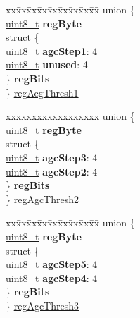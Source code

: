 \begin{DoxyCompactItemize}
\begin{tabbing}
\end{tabbing}\item 
\begin{tabbing}
xx\=xx\=xx\=xx\=xx\=xx\=xx\=xx\=xx\=\kill
union \{\\
\>\hyperlink{vl53l0x__types_8h_aba7bc1797add20fe3efdf37ced1182c5}{uint8\_t} {\bfseries regByte}\\
\>struct \{\\
\>\>\hyperlink{vl53l0x__types_8h_aba7bc1797add20fe3efdf37ced1182c5}{uint8\_t} {\bfseries agcStep1}: 4\\
\>\>\hyperlink{vl53l0x__types_8h_aba7bc1797add20fe3efdf37ced1182c5}{uint8\_t} {\bfseries unused}: 4\\
\>\} {\bfseries regBits}\\
\} \hyperlink{structFSK__Register__Map_a44e1c9fb070210d649b99ff66ad7172d}{regAcgThresh1}\\

\end{tabbing}\item 
\begin{tabbing}
xx\=xx\=xx\=xx\=xx\=xx\=xx\=xx\=xx\=\kill
union \{\\
\>\hyperlink{vl53l0x__types_8h_aba7bc1797add20fe3efdf37ced1182c5}{uint8\_t} {\bfseries regByte}\\
\>struct \{\\
\>\>\hyperlink{vl53l0x__types_8h_aba7bc1797add20fe3efdf37ced1182c5}{uint8\_t} {\bfseries agcStep3}: 4\\
\>\>\hyperlink{vl53l0x__types_8h_aba7bc1797add20fe3efdf37ced1182c5}{uint8\_t} {\bfseries agcStep2}: 4\\
\>\} {\bfseries regBits}\\
\} \hyperlink{structFSK__Register__Map_a6b97648671a439f2c9a73fb6c824b496}{regAgcThresh2}\\

\end{tabbing}\item 
\begin{tabbing}
xx\=xx\=xx\=xx\=xx\=xx\=xx\=xx\=xx\=\kill
union \{\\
\>\hyperlink{vl53l0x__types_8h_aba7bc1797add20fe3efdf37ced1182c5}{uint8\_t} {\bfseries regByte}\\
\>struct \{\\
\>\>\hyperlink{vl53l0x__types_8h_aba7bc1797add20fe3efdf37ced1182c5}{uint8\_t} {\bfseries agcStep5}: 4\\
\>\>\hyperlink{vl53l0x__types_8h_aba7bc1797add20fe3efdf37ced1182c5}{uint8\_t} {\bfseries agcStep4}: 4\\
\>\} {\bfseries regBits}\\
\} \hyperlink{structFSK__Register__Map_ab4b8e71cf88f17b36a9ca689f8defdf6}{regAgcThresh3}\\

\end{tabbing}\end{DoxyCompactItemize}


